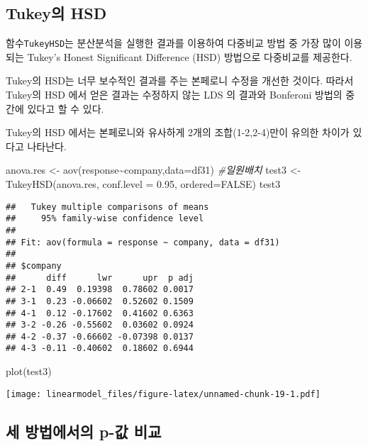 \documentclass[
]{book}
\newenvironment{Shaded}{\begin{snugshade}}{\end{snugshade}}
\newcommand{\AttributeTok}[1]{\textcolor[rgb]{0.77,0.63,0.00}{#1}}
\newcommand{\CommentTok}[1]{\textcolor[rgb]{0.56,0.35,0.01}{\textit{#1}}}
\newcommand{\ConstantTok}[1]{\textcolor[rgb]{0.00,0.00,0.00}{#1}}
\newcommand{\FloatTok}[1]{\textcolor[rgb]{0.00,0.00,0.81}{#1}}
\newcommand{\FunctionTok}[1]{\textcolor[rgb]{0.00,0.00,0.00}{#1}}
\newcommand{\NormalTok}[1]{#1}
\newcommand{\OtherTok}[1]{\textcolor[rgb]{0.56,0.35,0.01}{#1}}
\newcommand{\SpecialCharTok}[1]{\textcolor[rgb]{0.00,0.00,0.00}{#1}}
\begin{document}
\hypertarget{tukeyuxc758-hsd}{%
\subsection{Tukey의 HSD}\label{tukeyuxc758-hsd}}

함수\texttt{TukeyHSD}는 분산분석을 실행한 결과를 이용하여 다중비교 방법 중 가장
많이 이용되는 Tukey's Honest Significant Difference (HSD) 방법으로
다중비교를 제공한다.

Tukey의 HSD는 너무 보수적인 결과를 주는 본페로니 수정을 개선한 것이다.
따라서 Tukey의 HSD 에서 얻은 결과는 수정하지 않는 LDS 의 결과와 Bonferoni
방법의 중간에 있다고 할 수 있다.

Tukey의 HSD 에서는 본페로니와 유사하게 2개의 조합(1-2,2-4)만이 유의한
차이가 있다고 나타난다.

\begin{Shaded}
\begin{Highlighting}[]
\NormalTok{anova.res }\OtherTok{\textless{}{-}} \FunctionTok{aov}\NormalTok{(response}\SpecialCharTok{\textasciitilde{}}\NormalTok{company,}\AttributeTok{data=}\NormalTok{df31) }\CommentTok{\#일원배치}
\NormalTok{test3 }\OtherTok{\textless{}{-}} \FunctionTok{TukeyHSD}\NormalTok{(anova.res, }\AttributeTok{conf.level =} \FloatTok{0.95}\NormalTok{, }\AttributeTok{ordered=}\ConstantTok{FALSE}\NormalTok{)}
\NormalTok{test3}
\end{Highlighting}
\end{Shaded}

\begin{verbatim}
##   Tukey multiple comparisons of means
##     95% family-wise confidence level
## 
## Fit: aov(formula = response ~ company, data = df31)
## 
## $company
##      diff      lwr      upr  p adj
## 2-1  0.49  0.19398  0.78602 0.0017
## 3-1  0.23 -0.06602  0.52602 0.1509
## 4-1  0.12 -0.17602  0.41602 0.6363
## 3-2 -0.26 -0.55602  0.03602 0.0924
## 4-2 -0.37 -0.66602 -0.07398 0.0137
## 4-3 -0.11 -0.40602  0.18602 0.6944
\end{verbatim}

\begin{Shaded}
\begin{Highlighting}[]
\FunctionTok{plot}\NormalTok{(test3)}
\end{Highlighting}
\end{Shaded}

\texttt{[image: linearmodel\_files/figure-latex/unnamed-chunk-19-1.pdf]}

\hypertarget{uxc138-uxbc29uxbc95uxc5d0uxc11cuxc758-p-uxac12-uxbe44uxad50}{%
\subsection{세 방법에서의 p-값 비교}\label{uxc138-uxbc29uxbc95uxc5d0uxc11cuxc758-p-uxac12-uxbe44uxad50}}
\end{document}
